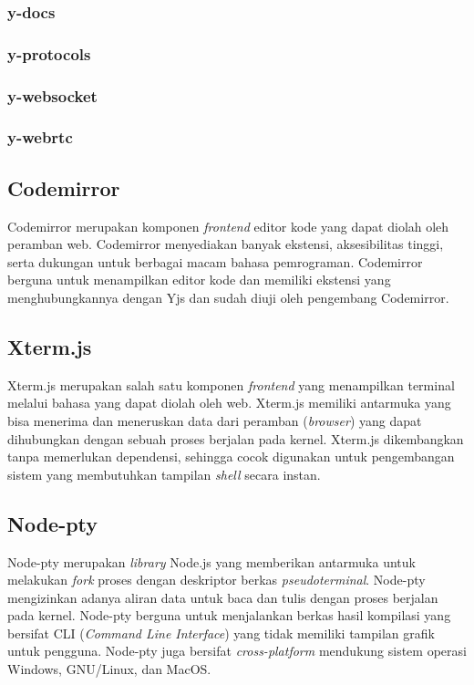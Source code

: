 \subsubsection{y-docs}

\subsubsection{y-protocols}

\subsubsection{y-websocket}

\subsubsection{y-webrtc}

\subsection{Codemirror}

Codemirror merupakan komponen \textit{frontend} editor kode yang dapat diolah oleh peramban web. Codemirror menyediakan banyak ekstensi, aksesibilitas tinggi, serta dukungan untuk berbagai macam bahasa pemrograman. Codemirror berguna untuk menampilkan editor kode dan memiliki ekstensi yang menghubungkannya dengan Yjs dan sudah diuji oleh pengembang Codemirror.

\subsection{Xterm.js}

Xterm.js merupakan salah satu komponen \textit{frontend} yang menampilkan terminal melalui bahasa yang dapat diolah oleh web. Xterm.js memiliki antarmuka yang bisa menerima dan meneruskan data dari peramban (\textit{browser}) yang dapat dihubungkan dengan sebuah proses berjalan pada kernel. Xterm.js dikembangkan tanpa memerlukan dependensi, sehingga cocok digunakan untuk pengembangan sistem yang membutuhkan tampilan \textit{shell} secara instan.

\subsection{Node-pty}

Node-pty merupakan \textit{library} Node.js yang memberikan antarmuka untuk melakukan \textit{fork} proses dengan deskriptor berkas \textit{pseudoterminal}. Node-pty mengizinkan adanya aliran data untuk baca dan tulis dengan proses berjalan pada kernel. Node-pty berguna untuk menjalankan berkas hasil kompilasi yang bersifat CLI (\textit{Command Line Interface}) yang tidak memiliki tampilan grafik untuk pengguna. Node-pty juga bersifat \textit{cross-platform} mendukung sistem operasi Windows, GNU/Linux, dan MacOS.


